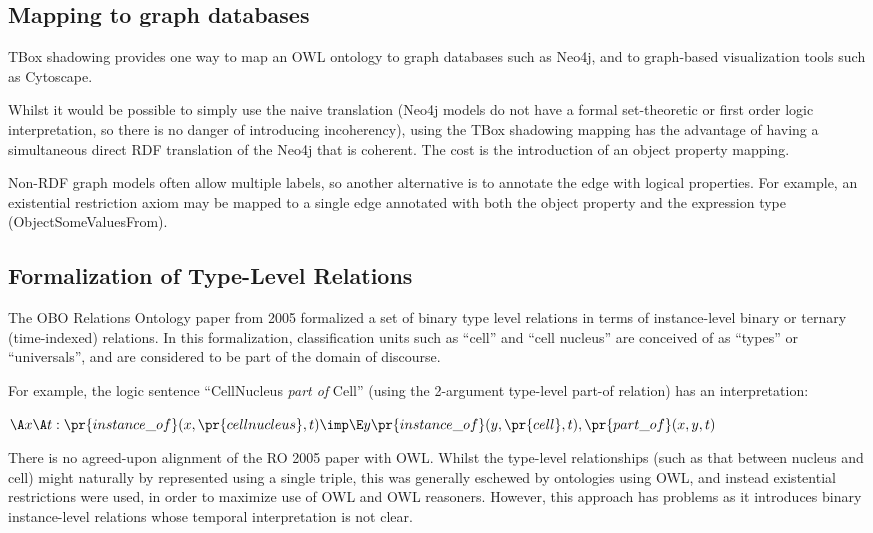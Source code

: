 \documentclass{my}
\def\partOf{\pr{part\_of}}
\def\instanceOf{\pr{instance\_of}}
\def\CellNucleus{\pr{cell nucleus}}
\def\Cell{\pr{cell}}
\begin{document}
\subsection{Mapping to graph databases}

TBox shadowing provides one way to map an OWL ontology to graph
databases such as Neo4j, and to graph-based visualization tools such
as Cytoscape.

Whilst it would be possible to simply use the naive translation (Neo4j
models do not have a formal set-theoretic or first order logic
interpretation, so there is no danger of introducing incoherency),
using the TBox shadowing mapping has the advantage of having a
simultaneous direct RDF translation of the Neo4j that is coherent. The
cost is the introduction of an object property mapping.

Non-RDF graph models often allow multiple labels, so another
alternative is to annotate the edge with logical properties. For
example, an existential restriction axiom may be mapped to a single
edge annotated with both the object property and the expression type
(ObjectSomeValuesFrom). 

\subsection{Formalization of Type-Level Relations}

The OBO Relations Ontology paper from 2005\cite{Smith2005} formalized
a set of binary type level relations in terms of instance-level binary
or ternary (time-indexed) relations. In this formalization,
classification units such as ``cell'' and ``cell nucleus'' are
conceived of as ``types'' or ``universals'', and are considered to be
part of the domain of discourse.

For example, the logic sentence ``CellNucleus \emph{part of} Cell''
(using the 2-argument type-level part-of relation) has an interpretation:

$
\A x \A t : \instanceOf(x, \CellNucleus, t) \imp \\
 \E y \instanceOf(y, \Cell, t), \partOf(x,y,t)
$

There is no agreed-upon alignment of the RO 2005 paper with
OWL. Whilst the type-level relationships (such as that between nucleus
and cell) might naturally by represented using a single triple, this
was generally eschewed by ontologies using OWL, and instead
existential restrictions were used\cite{golbreich2007obo}, in order to
maximize use of OWL and OWL reasoners. However, this approach has
problems as it introduces binary instance-level relations whose
temporal interpretation is not clear.
\end{document}
